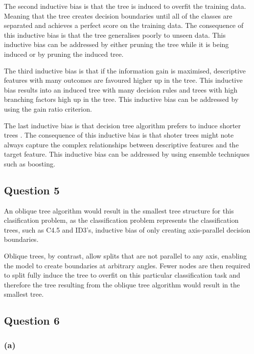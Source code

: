 \documentclass[10pt]{article}
\begin{document}
The second inductive bias is that the tree is induced to overfit the training data. Meaning that
the tree creates decision boundaries until all of the classes are separated and achieves a
perfect score on the training data. The consequence of this inductive bias is that the
tree generalises poorly to unseen data. This inductive bias can be addressed by either pruning the
tree while it is being induced or by pruning the induced tree.

The third inductive bias is that if the information gain is maximised, descriptive features with many
outcomes are favoured higher up in the tree. This inductive bias results into an induced tree with many decision
rules and trees with high branching factors high up in the tree. This inductive bias can be addressed by using
the gain ratio criterion.

The last inductive bias is that decision tree algorithm prefers to induce shorter trees \cite{sectionB-Q4}. The consequence
of this inductive bias is that shoter trees might note always capture the complex relationships between
descriptive features and the target feature. This inductive bias can be addressed by using ensemble techniques
such as boosting.

\subsection*{Question 5}

An oblique tree algorithm would result in the smallest tree structure for this clasification problem,
as the classification problem represents the classification trees, such as C4.5 and ID3's, inductive bias
of only creating axis-parallel decision boundaries.

Oblique trees, by contrast, allow splits that are not parallel to any axis, enabling the model to create
boundaries at arbitrary angles. Fewer nodes are then required to split fully induce the tree to overfit
on this particular classification task and therefore the tree resulting from the oblique
tree algorithm would result in the smallest tree.

\subsection*{Question 6}

\subsubsection*{(a)}
\end{document}
